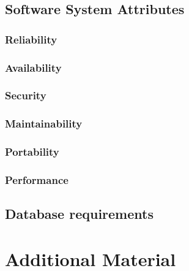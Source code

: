 \documentclass{article}[12pt,a4]
\begin{document}
\subsection{Software System Attributes}

\subsubsection{Reliability}


\subsubsection{Availability}


\subsubsection{Security}


\subsubsection{Maintainability}


\subsubsection{Portability}


\subsubsection{Performance}


\subsection{Database requirements}


\section{Additional Material}
\end{document}
